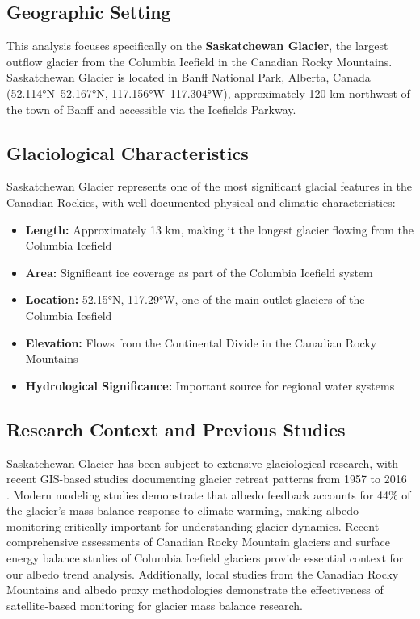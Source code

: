 \documentclass[12pt,a4paper]{article}
\begin{document}
\subsection{Geographic Setting}

This analysis focuses specifically on the \textbf{Saskatchewan Glacier}, the largest outflow glacier from the Columbia Icefield in the Canadian Rocky Mountains. Saskatchewan Glacier is located in Banff National Park, Alberta, Canada (52.114°N--52.167°N, 117.156°W--117.304°W), approximately 120 km northwest of the town of Banff and accessible via the Icefields Parkway.

\subsection{Glaciological Characteristics}

Saskatchewan Glacier represents one of the most significant glacial features in the Canadian Rockies, with well-documented physical and climatic characteristics:

\begin{itemize}
    \item \textbf{Length:} Approximately 13 km, making it the longest glacier flowing from the Columbia Icefield \cite{marshall_modelling_2022}
    \item \textbf{Area:} Significant ice coverage as part of the Columbia Icefield system \cite{marshall_modelling_2022}
    \item \textbf{Location:} 52.15°N, 117.29°W, one of the main outlet glaciers of the Columbia Icefield \cite{marshall_modelling_2022}
    \item \textbf{Elevation:} Flows from the Continental Divide in the Canadian Rocky Mountains
    \item \textbf{Hydrological Significance:} Important source for regional water systems \cite{gis_saskatchewan_2016}
\end{itemize}

\subsection{Research Context and Previous Studies}

Saskatchewan Glacier has been subject to extensive glaciological research, with recent GIS-based studies documenting glacier retreat patterns from 1957 to 2016 \cite{gis_saskatchewan_2016}. Modern modeling studies \cite{marshall_modelling_2022} demonstrate that albedo feedback accounts for 44\% of the glacier's mass balance response to climate warming, making albedo monitoring critically important for understanding glacier dynamics. Recent comprehensive assessments of Canadian Rocky Mountain glaciers \cite{Menounos2019RockiesMassBalance} and surface energy balance studies of Columbia Icefield glaciers \cite{Pelto2022ColumbiaEnergyBalance, Intsiful2021ColumbiaIcefield} provide essential context for our albedo trend analysis. Additionally, local studies from the Canadian Rocky Mountains \cite{Marshall2020HaigGlacier} and albedo proxy methodologies \cite{Davaze2018AlbedoProxy} demonstrate the effectiveness of satellite-based monitoring for glacier mass balance research.
\end{document}
